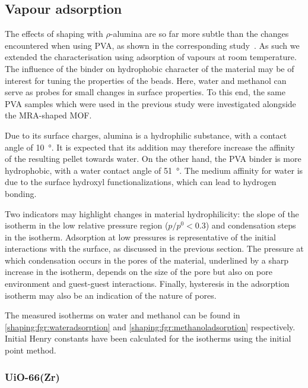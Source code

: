 
\subsection{Vapour adsorption}

The effects of shaping with \(\rho\)-alumina are 
so far more subtle than the changes encountered when using 
PVA, as shown in the corresponding 
study~\cite{chanutObservingEffectsShaping2016}.
As such we extended the characterisation using adsorption
of vapours at room temperature.
The influence of the binder on hydrophobic character of the
material may be of interest for tuning the properties of the 
beads. Here, water and methanol
can serve as probes for small changes in surface properties.
To this end, the same PVA samples which were 
used in the previous study were investigated alongside 
the MRA-shaped MOF.

Due to its surface charges, alumina is a 
hydrophilic substance, with a contact 
angle of \SI{10}{\degree}. It is expected that its 
addition may therefore increase the affinity 
of the resulting pellet towards water. On the other hand,
the PVA binder is more hydrophobic, with a water contact
angle of \SI{51}{\degree}. The medium affinity for water
is due to the surface hydroxyl functionalizations, which
can lead to hydrogen bonding.

Two indicators may highlight changes in material hydrophilicity: 
the slope of the isotherm in the low relative pressure region 
(\(p/p^0 < 0.3\)) and condensation steps in the isotherm. 
Adsorption at low pressures is representative of the initial
interactions with the surface, as discussed in the previous section.
The pressure at which condensation occurs in the pores of the material, 
underlined by a sharp increase in the isotherm, depends on the 
size of the pore but also on pore environment and 
guest-guest interactions. Finally, hysteresis in the adsorption 
isotherm may also be an indication of the nature of pores.

The measured isotherms on water and methanol can be found
in \autoref{shaping:fgr:wateradsorption} 
and \autoref{shaping:fgr:methanoladsorption} respectively.
Initial Henry constants have been calculated for the isotherms
using the initial point method.


\subsubsection{UiO-66(Zr)}

